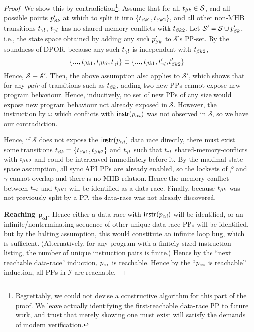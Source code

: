 \begin{proof}
We show this by contradiction\footnote{
Regrettably, we could not devise a constructive algorithm for this part of the proof.
We leave actually identifying the first-reachable data-race PP to future work,
and trust that merely showing one must exist will satisfy the demands of modern verification.}:
%
Assume that for all $t_{\beta{}k} \in \mathcal{S}$,
and all possible points $p_{\beta{}k}'$ at which to split it into $\{t_{\beta{}k1},t_{\beta{}k2}\}$,
and all other non-MHB transitions $t_{\gamma{}l}$,
$t_{\gamma{}l}$ has no shared memory conflicts with $t_{\beta{}k2}$.
%
Let $\mathcal{S}' = \mathcal{S} \cup p_{\beta{}k}'$, i.e., the state space obtained by adding any such $p_{\beta{}k}'$ to $\mathcal{S}$'s PP-set.
By the soundness of DPOR, because any such $t_{\gamma{}l}$ is independent with $t_{\beta{}k2}$,
\[
	\{..., t_{\beta{}k1}, t_{\beta{}k2}, t_{\gamma{}l}\}
	\equiv
	\{..., t_{\beta{}k1}, t_{\gamma{}l}', t_{\beta{}k2}'\}
\]
Hence, $\mathcal{S} \equiv \mathcal{S}'$. %
Then, the above assumption also applies to $\mathcal{S}'$,
which shows that for any {\em pair} of transitions such as $t_{\beta{}k}$, adding two new PPs cannot expose new program behaviour.
Hence, inductively, no set of new PPs of any size would expose new program behaviour not already exposed in $\mathcal{S}$.
However, the instruction by $\omega$ which conflicts with $\mathsf{instr}(p_{\alpha{}i})$ was not observed in $\mathcal{S}$,
so we have our contradiction.

Hence, if $\mathcal{S}$ does not expose the $\mathsf{instr}(p_{\alpha{}i})$ data race directly,
there must exist some transitions $t_{\beta{}k} = \{t_{\beta{}k1},t_{\beta{}k2}\}$ and $t_{\gamma{}l}$ such that $t_{\gamma{}l}$ shared-memory-conflicts with $t_{\beta{}k2}$ and could be interleaved immediately before it.
By the maximal state space assumption, all sync API PPs are already enabled, so the locksets of $\beta$ and $\gamma$ cannot overlap and there is no MHB relation.
Hence the memory conflict between $t_{\gamma{}l}$ and $t_{\beta{}k2}$ will be identified as a data-race.
Finally, because $t_{\beta{}k}$ was not previously split by a PP, the data-race was not already discovered.

{\bf Reaching $\mathbf{p_{\alpha{}i}}$.}
Hence either a data-race with $\mathsf{instr}(p_{\alpha{}i})$ will be identified,
or an infinite/nonterminating sequence of other unique data-race PPs will be identified,
but by the halting assumption, this would constitute an infinite loop bug, which is sufficient.
(Alternatively, for any program with a finitely-sized instruction listing, the number of unique instruction pairs is finite.)
Hence by the ``next reachable data-race'' induction, $p_{\alpha{}i}$ is reachable.
Hence by the ``$p_{\alpha{}i}$ is reachable'' induction, all PPs in $\mathcal{I}$ are reachable.
\end{proof}

